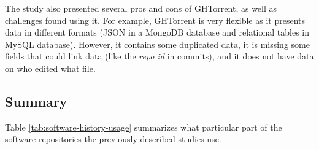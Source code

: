 The study also presented several pros and cons of GHTorrent, as well as challenges found using it. For example, GHTorrent is very flexible as it presents data in different formats (JSON in a MongoDB database and relational tables in MySQL database). However, it contains some duplicated data, it is missing some fields that could link data (like the \textit{repo id} in commits), and it does not have data on who edited what file.

\subsection{Summary}
Table \ref{tab:software-history-usage} summarizes what particular part of the software repositories the previously described studies use.


